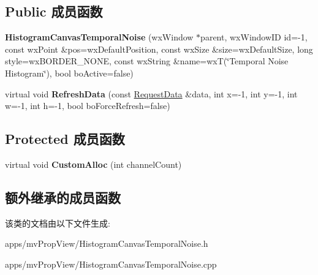 \subsection*{Public 成员函数}
\begin{DoxyCompactItemize}
\item 
\hypertarget{class_histogram_canvas_temporal_noise_a2eb8384b62e5ac3d6dcb30247569e0ff}{{\bfseries Histogram\+Canvas\+Temporal\+Noise} (wx\+Window $\ast$parent, wx\+Window\+I\+D id=-\/1, const wx\+Point \&pos=wx\+Default\+Position, const wx\+Size \&size=wx\+Default\+Size, long style=wx\+B\+O\+R\+D\+E\+R\+\_\+\+N\+O\+N\+E, const wx\+String \&name=wx\+T(\char`\"{}Temporal Noise Histogram\char`\"{}), bool bo\+Active=false)}\label{class_histogram_canvas_temporal_noise_a2eb8384b62e5ac3d6dcb30247569e0ff}

\item 
\hypertarget{class_histogram_canvas_temporal_noise_a2278469432b2603ef1c82ad5cf4216c3}{virtual void {\bfseries Refresh\+Data} (const \hyperlink{struct_request_data}{Request\+Data} \&data, int x=-\/1, int y=-\/1, int w=-\/1, int h=-\/1, bool bo\+Force\+Refresh=false)}\label{class_histogram_canvas_temporal_noise_a2278469432b2603ef1c82ad5cf4216c3}

\end{DoxyCompactItemize}
\subsection*{Protected 成员函数}
\begin{DoxyCompactItemize}
\item 
\hypertarget{class_histogram_canvas_temporal_noise_a1c1231bfeb489fc2028875d09621726e}{virtual void {\bfseries Custom\+Alloc} (int channel\+Count)}\label{class_histogram_canvas_temporal_noise_a1c1231bfeb489fc2028875d09621726e}

\end{DoxyCompactItemize}
\subsection*{额外继承的成员函数}


该类的文档由以下文件生成\+:\begin{DoxyCompactItemize}
\item 
apps/mv\+Prop\+View/Histogram\+Canvas\+Temporal\+Noise.\+h\item 
apps/mv\+Prop\+View/Histogram\+Canvas\+Temporal\+Noise.\+cpp\end{DoxyCompactItemize}
